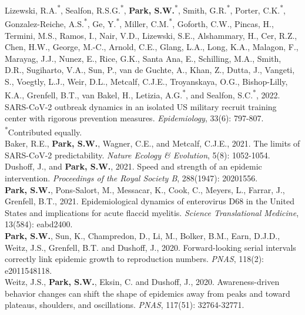 \documentclass[11pt]{article} %
\begin{document}
 Lizewski, R.A.\textsuperscript{*}, Sealfon, R.S.G.\textsuperscript{*}, \textbf{Park, S.W.}\textsuperscript{*}, Smith, G.R.\textsuperscript{*}, Porter, C.K.\textsuperscript{*}, Gonzalez-Reiche, A.S.\textsuperscript{*}, Ge, Y.\textsuperscript{*}, Miller, C.M.\textsuperscript{*}, Goforth, C.W., Pincas, H., Termini, M.S., Ramos, I., Nair, V.D., Lizewski, S.E., Alshammary, H., Cer, R.Z., Chen, H.W., George, M.-C., Arnold, C.E., Glang, L.A., Long, K.A., Malagon, F., Marayag, J.J., Nunez, E., Rice, G.K., Santa Ana, E., Schilling, M.A., Smith, D.R., Sugiharto, V.A., Sun, P., van de Guchte, A., Khan, Z., Dutta, J., Vangeti, S., Voegtly, L.J., Weir, D.L., Metcalf, C.J.E., Troyanskaya, O.G., Bishop-Lilly, K.A., Grenfell, B.T., van Bakel, H., Letizia, A.G.\textsuperscript{*}, and Sealfon, S.C.\textsuperscript{*}, 2022. SARS-CoV-2 outbreak dynamics in an isolated US military recruit training center with rigorous prevention measures. \textit{Epidemiology}, 33(6): 797-807.\\
\textsuperscript{*}Contributed equally.\\

 Baker, R.E., \textbf{Park, S.W.}, Wagner, C.E., and Metcalf, C.J.E., 2021. The limits of SARS-CoV-2 predictability. \textit{Nature Ecology \& Evolution}, 5(8): 1052-1054.\\

 Dushoff, J., and \textbf{Park, S.W.}, 2021. Speed and strength of an epidemic intervention. \textit{Proceedings of the Royal Society B}, 288(1947): 20201556.\\

 \textbf{Park, S.W.}, Pons-Salort, M., Messacar, K., Cook, C., Meyers, L., Farrar, J., Grenfell, B.T., 2021. Epidemiological dynamics of enterovirus D68 in the United States and implications for acute flaccid myelitis. \textit{Science Translational Medicine}, 13(584): eabd2400.\\

 \textbf{Park, S.W.}, Sun, K., Champredon, D., Li, M., Bolker, B.M., Earn, D.J.D., Weitz, J.S., Grenfell, B.T. and Dushoff, J., 2020. Forward-looking serial intervals correctly link epidemic growth to reproduction numbers. \textit{PNAS}, 118(2): e2011548118.\\

 Weitz, J.S., \textbf{Park, S.W.}, Eksin, C. and Dushoff, J., 2020. Awareness-driven behavior changes can shift the shape of epidemics away from peaks and toward plateaus, shoulders, and oscillations. \textit{PNAS}, 117(51): 32764-32771.\\
\end{document}
